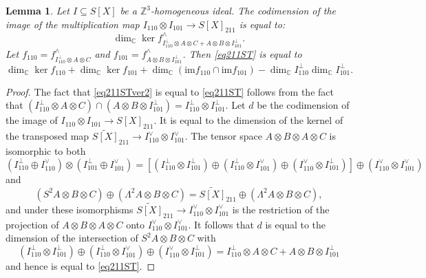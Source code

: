 \documentclass[12pt]{amsart}
\newtheorem{lemma}[theorem]{Lemma}
\theoremstyle{definition}
\theoremstyle{remark}
\theoremstyle{definition}
\newcommand{\CC}{\mathbb{C}}
\begin{document}
\begin{lemma}\label{lem:partial211ST}
    Let $I\subseteq S[X]$ be a $\mathbb{Z}^3$-homogeneous ideal. The codimension of the image of the multiplication map $I_{110}\otimes I_{101} \to S[X]_{211}$ is equal to:
    \begin{equation}\label{eq211ST}
    \dim_\CC \ker f^{\wedge}_{I_{110}^\perp\otimes A\otimes C  + A\otimes B \otimes I_{101}^\perp}.
    \end{equation}
    Let $f_{110} = f^{\wedge}_{I_{110}^\perp \otimes A\otimes C}$ and $f_{101} = f^\wedge_{A\otimes B \otimes I_{101}^\perp}$. Then \eqref{eq211ST} is equal to 
    \begin{equation}\label{eq211STver2}
    \dim_\CC \ker f_{110} + \dim_\CC \ker f_{101} + \dim_\CC (\mathrm{im} f_{110} \cap \mathrm{im} f_{101}) - \dim_\CC I_{110}^\perp \dim_\CC I_{101}^\perp.    
    \end{equation}
\end{lemma}
\begin{proof}
  The fact that \eqref{eq211STver2} is equal to \eqref{eq211ST} follows from the fact that $(I_{110}^\perp \otimes A\otimes C)\cap ( A\otimes B \otimes I_{101}^\perp) = I_{110}^\perp \otimes I_{101}^\perp$. Let $d$ be the codimension of the image of $I_{110}\otimes I_{101} \to S[X]_{211}$. It is equal to the dimension of the kernel of the transposed map $
  \widetilde{S[X]}_{211} \to I_{110}^\vee\otimes I_{101}^\vee$.
  The tensor space $A\otimes B\otimes A\otimes C$ is isomorphic to both
  \[
  (I_{110}^\perp\oplus I_{110}^\vee) \otimes (I_{101}^\perp \oplus I_{101}^\vee)= [(I_{110}^\perp\otimes I_{101}^\perp) \oplus  (I_{110}^\perp \otimes I_{101}^\vee)\oplus (I_{110}^\vee\otimes I_{101}^\perp)]\oplus (I_{110}^\vee\otimes I_{101}^\vee)
  \]
  and
  \[
  (S^2 A\otimes B\otimes C)  \oplus (\Lambda^2A \otimes B\otimes C)= \widetilde{S[X]}_{211} \oplus (\Lambda^2 A\otimes B\otimes C),
  \]
and under these isomorphisms $\widetilde{S[X]}_{211} \to I_{110}^\vee\otimes I_{101}^\vee$ is the restriction of the projection of $A\otimes B\otimes A\otimes C$ onto $I_{110}^\vee\otimes I_{101}^\vee$. It follows that $d$ is equal to the dimension of the intersection of  $S^2A\otimes B\otimes C$ with 
  \[
  (I_{110}^\perp\otimes I_{101}^\perp) \oplus ( I_{110}^\perp\otimes I_{101}^\vee) \oplus ( I_{110}^\vee\otimes I_{101}^\perp) = I_{110}^\perp \otimes A\otimes C + A\otimes B \otimes I_{101}^\perp 
  \]
  and hence is equal to \eqref{eq211ST}.
\end{proof}
\end{document}

